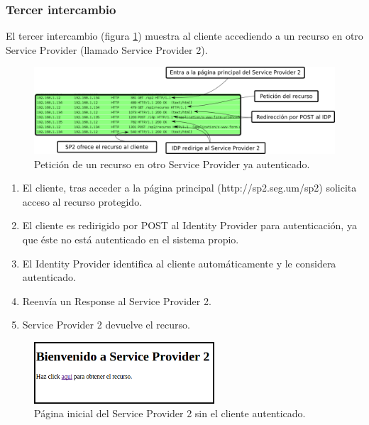 \subsubsection*{Tercer intercambio}
El tercer intercambio (figura \ref{fig:int3}) muestra al cliente accediendo a un recurso en otro Service Provider (llamado Service Provider 2).

\begin{figure}[h!]
\centering
\includegraphics[width=\textwidth]{img/intercambio3-comentado}
\caption{Petición de un recurso en otro Service Provider ya autenticado.}
\label{fig:int3}
\end{figure}

\begin{enumerate}
 \item El cliente, tras acceder a la página principal (http://sp2.seg.um/sp2) solicita acceso al recurso protegido.
 \item El cliente es redirigido por POST al Identity Provider para autenticación, ya que éste no está autenticado en el sistema propio.
 \item El Identity Provider identifica al cliente automáticamente y le considera autenticado.
 \item Reenvía un Response al Service Provider 2.
 \item Service Provider 2 devuelve el recurso.
\end{enumerate}

\begin{figure}[h!]
\centering
\includegraphics[width=0.6\textwidth]{img/sp2}
\caption{Página inicial del Service Provider 2 sin el cliente autenticado.}
\label{fig:sp2}
\end{figure}

